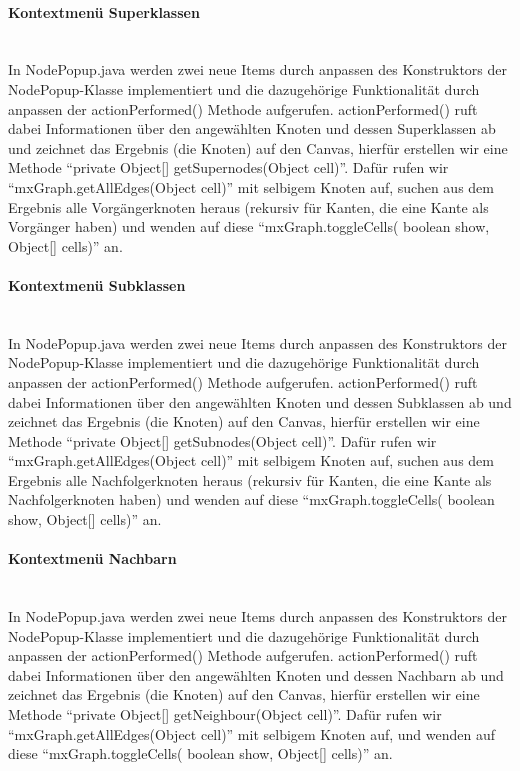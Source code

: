 \documentclass[10pt,a4paper]{article}
\begin{document}
\paragraph{Kontextmenü Superklassen}\ \\ 
In NodePopup.java werden zwei neue Items durch anpassen des Konstruktors der NodePopup-Klasse implementiert und die dazugehörige Funktionalität durch anpassen der actionPerformed() Methode aufgerufen. actionPerformed() ruft dabei Informationen über den angewählten Knoten und dessen Superklassen ab und zeichnet das Ergebnis (die Knoten) auf den Canvas, hierfür erstellen wir eine Methode "`private Object[] getSupernodes(Object cell)"'. Dafür rufen wir "`mxGraph.getAllEdges(Object cell)"' mit selbigem Knoten auf, suchen aus dem Ergebnis alle Vorgängerknoten heraus (rekursiv für Kanten, die eine Kante als Vorgänger haben) und wenden auf diese "`mxGraph.toggleCells( boolean show, Object[] cells)"' an.

\paragraph{Kontextmenü Subklassen}\ \\ 
In NodePopup.java werden zwei neue Items durch anpassen des Konstruktors der NodePopup-Klasse implementiert und die dazugehörige Funktionalität durch anpassen der actionPerformed() Methode aufgerufen. actionPerformed() ruft dabei Informationen über den angewählten Knoten und dessen Subklassen ab und zeichnet das Ergebnis (die Knoten) auf den Canvas, hierfür erstellen wir eine Methode "`private Object[] getSubnodes(Object cell)"'. Dafür rufen wir "`mxGraph.getAllEdges(Object cell)"' mit selbigem Knoten auf, suchen aus dem Ergebnis alle Nachfolgerknoten heraus (rekursiv für Kanten, die eine Kante als Nachfolgerknoten haben) und wenden auf diese "`mxGraph.toggleCells( boolean show, Object[] cells)"' an.

\paragraph{Kontextmenü Nachbarn}\ \\ 
In NodePopup.java werden zwei neue Items durch anpassen des Konstruktors der NodePopup-Klasse implementiert und die dazugehörige Funktionalität durch anpassen der actionPerformed() Methode aufgerufen. actionPerformed() ruft dabei Informationen über den angewählten Knoten und dessen Nachbarn ab und zeichnet das Ergebnis (die Knoten) auf den Canvas, hierfür erstellen wir eine Methode "`private Object[] getNeighbour(Object cell)"'. Dafür rufen wir "`mxGraph.getAllEdges(Object cell)"' mit selbigem Knoten auf, und wenden auf diese "`mxGraph.toggleCells( boolean show, Object[] cells)"' an.
\end{document}
